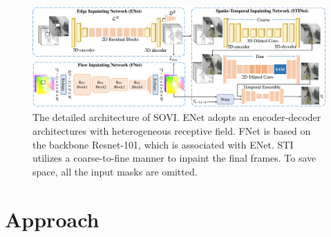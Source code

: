 \begin{figure}[t]
	\centering
	\includegraphics[width=2.0\columnwidth]{sti} %
	\caption{The detailed architecture of SOVI. ENet adopts an encoder-decoder architectures with heterogeneous receptive field.
	FNet is based on the backbone Resnet-101, which is associated with ENet. STI utilizes a coarse-to-fine manner to inpaint the final frames. To save space, all the input masks are omitted.}
	
	\label{fig:stiNet}
\end{figure}

\section{Approach}
\label{sec:approach}

